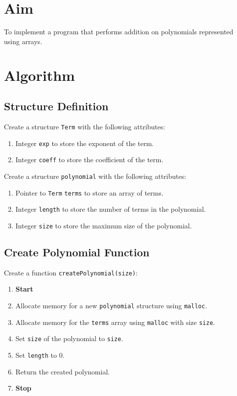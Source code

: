 
\section{Aim}
To implement a program that performs addition on polynomials represented using arrays.

\section{Algorithm}
 {\selectfont

  \subsection{Structure Definition}
  Create a structure \texttt{Term} with the following attributes:
  \begin{enumerate}[label=\arabic*:,left=0pt]
    \item Integer \texttt{exp} to store the exponent of the term.
    \item Integer \texttt{coeff} to store the coefficient of the term.
  \end{enumerate}

  Create a structure \texttt{polynomial} with the following attributes:
  \begin{enumerate}[label=\arabic*:,left=0pt]
    \item Pointer to \texttt{Term} \texttt{terms} to store an array of terms.
    \item Integer \texttt{length} to store the number of terms in the polynomial.
    \item Integer \texttt{size} to store the maximum size of the polynomial.
  \end{enumerate}

  \subsection{Create Polynomial Function}
  Create a function \texttt{createPolynomial(size)}:
  \begin{enumerate}[label=\arabic*:,left=0pt]
    \item \textbf{Start}
    \item Allocate memory for a new \texttt{polynomial} structure using \texttt{malloc}.
    \item Allocate memory for the \texttt{terms} array using \texttt{malloc} with size \texttt{size}.
    \item Set \texttt{size} of the polynomial to \texttt{size}.
    \item Set \texttt{length} to 0.
    \item Return the created polynomial.
    \item \textbf{Stop}
  \end{enumerate}

}
